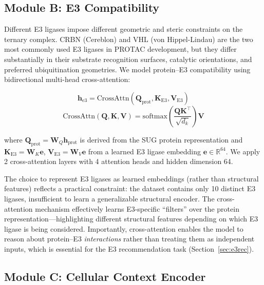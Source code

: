 \documentclass[sigconf]{acmart}
\begin{document}
\subsection{Module B: E3 Compatibility}
\label{sec:e3compat}

Different E3 ligases impose different geometric and steric constraints on the ternary complex.
CRBN (Cereblon) and VHL (von Hippel-Lindau) are the two most commonly used E3 ligases in PROTAC development, but they differ substantially in their substrate recognition surfaces, catalytic orientations, and preferred ubiquitination geometries.
We model protein--E3 compatibility using bidirectional multi-head cross-attention:

\begin{equation}
    \mathbf{h}_{\text{e3}} = \text{CrossAttn}(\mathbf{Q}_{\text{prot}}, \mathbf{K}_{\text{E3}}, \mathbf{V}_{\text{E3}})
\end{equation}
\begin{equation}
    \text{CrossAttn}(\mathbf{Q}, \mathbf{K}, \mathbf{V}) = \text{softmax}\!\left(\frac{\mathbf{Q}\mathbf{K}^\top}{\sqrt{d_k}}\right)\mathbf{V}
\end{equation}

where $\mathbf{Q}_{\text{prot}} = \mathbf{W}_Q \mathbf{h}_{\text{prot}}$ is derived from the SUG protein representation and $\mathbf{K}_{\text{E3}} = \mathbf{W}_K \mathbf{e}$, $\mathbf{V}_{\text{E3}} = \mathbf{W}_V \mathbf{e}$ from a learned E3 ligase embedding $\mathbf{e} \in \mathbb{R}^{64}$.
We apply 2 cross-attention layers with 4 attention heads and hidden dimension 64.

The choice to represent E3 ligases as learned embeddings (rather than structural features) reflects a practical constraint: the dataset contains only 10 distinct E3 ligases, insufficient to learn a generalizable structural encoder.
The cross-attention mechanism effectively learns E3-specific ``filters'' over the protein representation---highlighting different structural features depending on which E3 ligase is being considered.
Importantly, cross-attention enables the model to reason about protein--E3 \emph{interactions} rather than treating them as independent inputs, which is essential for the E3 recommendation task (Section~\ref{sec:e3rec}).

\subsection{Module C: Cellular Context Encoder}
\end{document}
